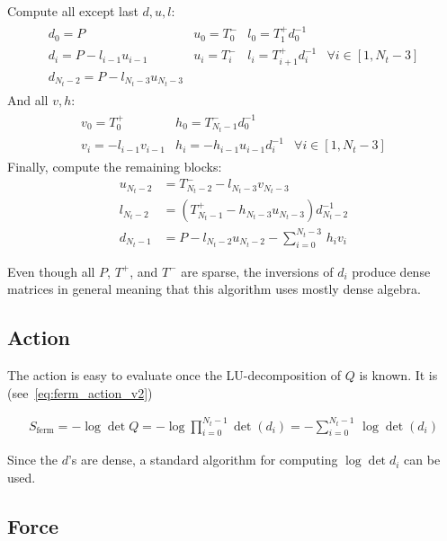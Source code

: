\documentclass[a4paper, fleqn, twoside, notitlepage]{scrartcl}
\begin{document}
\noindent
Compute all except last $d, u, l$:
\begin{align}
  \begin{matrix}
    d_0 = P                & u_0 = T^-_0 & l_0 = T^+_1 d_{0}^{-1} & \\
    d_i = P - l_{i-1}u_{i-1} & u_i = T^-_i & l_i = T^+_{i+1} d_{i}^{-1} & \forall i \in [1, N_t-3] \\
    d_{N_t-2} = P - l_{N_t-3} u_{N_t-3} & & &
  \end{matrix}
\end{align}
And all $v, h$:
\begin{align}
  \begin{matrix}
    v_0 = T^+_0           & h_0 = T^-_{N_t-1} d_0^{-1} & \\
    v_i = - l_{i-1} v_{i-1} & h_i = - h_{i-1} u_{i-1} d_{i}^{-1} & \forall i \in [1, N_t-3]
  \end{matrix}
\end{align}
Finally, compute the remaining blocks:
\begin{align}
  u_{N_t-2} &= T^-_{N_t-2} - l_{N_t-3} v_{N_t-3}\\
  l_{N_t-2} &= (T^+_{N_t-1} - h_{N_t-3} u_{N_t-3}) d_{N_t-2}^{-1}\\
  d_{N_t-1} &= P - l_{N_t-2}u_{N_t-2} - \sum_{i=0}^{N_t-3}\, h_i v_i
\end{align}

\noindent
Even though all $P$, $T^+$, and $T^-$ are sparse, the inversions of $d_i$ produce dense matrices in general meaning that this algorithm uses mostly dense algebra.

\subsection{Action}

The action is easy to evaluate once the LU-decomposition of $Q$ is known. It is (see~\eqref{eq:ferm_action_v2})
\begin{resultbox}
  \vspace{-\baselineskip}
  \begin{align}
    S_\text{ferm} = - \log \det Q = -\log \prod_{i=0}^{N_t-1} \det (d_i) = -\sum_{i=0}^{N_t-1}\, \log \det (d_i)
  \end{align}
\end{resultbox}
\noindent
Since the $d$'s are dense, a standard algorithm for computing $\log\det d_i$ can be used.

\subsection{Force}
\end{document}
